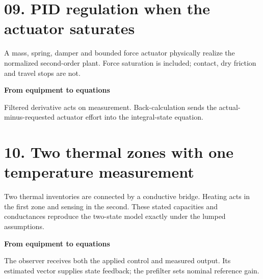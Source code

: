 \documentclass[10pt,a4paper]{article}
\begin{document}
\section*{09. PID regulation when the actuator saturates}
\begin{center}\resizebox{.88\linewidth}{!}{}\par{\small A mass, spring, damper and bounded force actuator physically realize the normalized second-order plant. Force saturation is included; contact, dry friction and travel stops are not.}\end{center}
\medskip\textbf{From equipment to equations}\par
\begin{center}\resizebox{\ifdim\width>.98\linewidth.98\linewidth\else\width\fi}{!}{}\par{\small Filtered derivative acts on measurement. Back-calculation sends the actual-minus-requested actuator effort into the integral-state equation.}\end{center}

\newpage
\section*{10. Two thermal zones with one temperature measurement}
\begin{center}\resizebox{.88\linewidth}{!}{}\par{\small Two thermal inventories are connected by a conductive bridge. Heating acts in the first zone and sensing in the second. These stated capacities and conductances reproduce the two-state model exactly under the lumped assumptions.}\end{center}
\medskip\textbf{From equipment to equations}\par
\begin{center}\resizebox{\ifdim\width>.98\linewidth.98\linewidth\else\width\fi}{!}{}\par{\small The observer receives both the applied control and measured output. Its estimated vector supplies state feedback; the prefilter sets nominal reference gain.}\end{center}

\newpage
\end{document}
